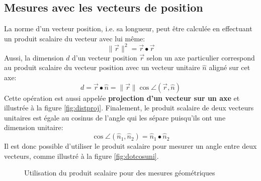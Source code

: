 \subsection{Mesures avec les vecteurs de position}
\label{sec:vecuni}
%
La norme d'un vecteur position, i.e. sa longueur, peut être calculée en effectuant un produit scalaire du vecteur avec lui même:
\begin{equation}
\| \vec{r} \|^2 = \vec{r} \bullet \vec{r} 
\label{eq:dotnorm}
\end{equation} 
Aussi, la dimension $d$ d'un vecteur position $\vec{r}$ selon un axe particulier correspond au produit scalaire du vecteur position avec un vecteur unitaire $\hat{n}$ aligné sur cet axe:
\begin{equation}
d = \vec{r} \bullet \hat{n} = \| \vec{r} \|  \cos \angle (\vec{r},\hat{n})
\label{eq:vecproj}
\end{equation} 
Cette opération est aussi appelée \textbf{projection d'un vecteur sur un axe} et illustrée à la figure \ref{fig:distproj}. Finalement, le produit scalaire de deux vecteurs unitaires est égale au cosinus de l'angle qui les sépare puisqu'ils ont une dimension unitaire:
\begin{equation}
\cos \angle (\hat{n}_1,\hat{n}_2) =  \hat{n}_1 \bullet \hat{n}_2
\label{eq:dotangle}
\end{equation} 
Il est donc possible d'utiliser le produit scalaire pour mesurer un angle entre deux vecteurs, comme illustré à la figure \ref{fig:dotcosuni}.  
%
\begin{figure}[htbp]
        \centering
				\hspace{20pt}
        \caption{Utilisation du produit scalaire pour des mesures géométriques}
				\label{fig:utprosca}
\end{figure}

